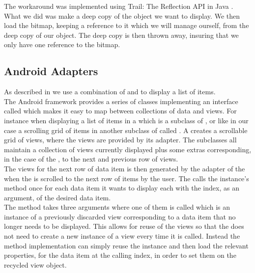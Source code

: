 The workaround was implemented using Trail: The Reflection API in Java \parencite{java_trail_reflection}. What we did was make a deep copy of the  object we want to display. We then load the bitmap, keeping a reference to it which we will manage ourself, from the deep copy of our object. The deep copy is then thrown away, insuring that we only have one reference to the bitmap.

\subsection{Android Adapters}

As described in  we use a combination of  and  to display a list of items. \\

The Android framework provides a series of classes implementing an interface called  which makes it easy to map between collections of data and views. For instance when displaying a list of items in a  which is a subclass of , or like in our case a scrolling grid of items in another subclass of  called . A  creates a scrollable grid of views, where the views are provided by its adapter. The  subclasses all maintain a collection of views currently displayed plus some extras corresponding, in the case of the , to the next and previous row of views. \\

The views for the next row of data item is then generated by the adapter of the  when the  is scrolled to the next row of items by the user. The  calls the  instance's  method once for each data item it wants to display each with the index, as an argument, of the desired data item. \\

The  method takes three arguments where one of them is called  which is an instance of a previously discarded view corresponding to a data item that no longer needs to be displayed. This allows for reuse of the views so that the  does not need to create a new instance of a view every time it is called. Instead the  method implementation can simply reuse the   instance and then load the relevant properties, for the data item at the calling index, in order to set them on the recycled view object. \\

